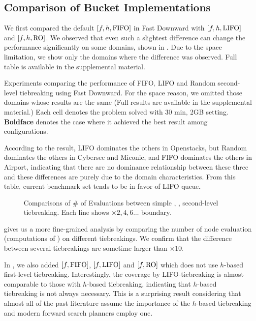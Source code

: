 \subsection{Comparison of Bucket Implementations}

We first compared the default $[f,h,\mbox{FIFO}]$ in Fast Downward with
$[f,h,\mbox{LIFO}]$ and $[f,h,\mbox{RO}]$.  We observed that even such a slightest
difference can change the performance significantly on some domains,
shown in . Due to the space limitation, we show
only the domains where the difference was observed. Full table is
available in the supplemental material.

\begin{table}[htbp]
 \centering {} 
  \caption{Experiments
 comparing the performance of FIFO, LIFO and Random second-level
 tiebreaking using Fast Downward. For the space reason, we omitted those
 domains whose results are the same (Full results are available in the
 supplemental material.) Each cell denotes the problem solved with 30
 min, 2GB setting. \textbf{Boldface} denotes the case where it achieved
 the best result among configurations.}  \label{single-coverage}
\end{table}

According to the result, LIFO dominates the others in Openstacks, but
Random dominates the others in Cybersec and Miconic, and FIFO dominates
the others in Airport, indicating that there are no dominance
relationship between these three and these differences are purely due to
the domain characteristics.  From this table, current benchmark set
tends to be in favor of LIFO queue.

\begin{figure}[htbp]
 \centering {}
 
 \caption{Comparisons of \# of Evaluations between simple \lifo, \fifo,
 \ro second-level tiebreaking. Each line shows $\times 2,4,6\ldots$ boundary.}
 \label{f-h-eval}
\end{figure}

 gives us a more fine-grained analysis by comparing the
number of node evaluation (computations of \lmcut) on
different tiebreakings. We confirm that the difference between several
tiebreakings are sometime larger than $\times 10$.

In , we also added $[f,\mbox{FIFO}]$, $[f,\mbox{LIFO}]$ and
$[f,\mbox{RO}]$ which does not use $h$-based first-level tiebreaking.
Interestingly, the coverage by LIFO-tiebreaking is almost comparable to
those with $h$-based tiebreaking, indicating that $h$-based tiebreaking
is not always necessary.  This is a surprising result considering
that almost all of the past literature assume the importance of the
$h$-based tiebreaking and modern forward search planners employ one.

